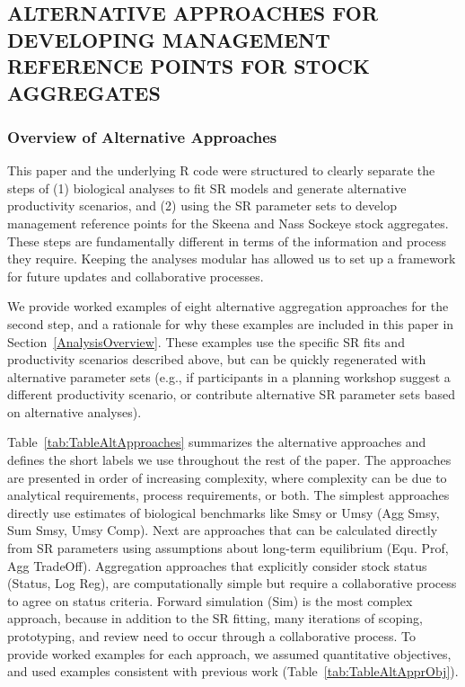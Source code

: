 \documentclass[french,11pt]{book}
\begin{document}
\endgroup{} \endgroup{}

\clearpage

\subsection{ALTERNATIVE APPROACHES FOR DEVELOPING MANAGEMENT REFERENCE POINTS FOR STOCK AGGREGATES}\label{AltApproachesComp}

\subsubsection{Overview of Alternative Approaches}\label{overview-of-alternative-approaches}

This paper and the underlying R code were structured to clearly separate the steps of (1) biological analyses to fit SR models and generate alternative productivity scenarios, and (2) using the SR parameter sets to develop management reference points for the Skeena and Nass Sockeye stock aggregates. These steps are fundamentally different in terms of the information and process they require. Keeping the analyses modular has allowed us to set up a framework for future updates and collaborative processes.

We provide worked examples of eight alternative aggregation approaches for the second step, and a rationale for why these examples are included in this paper in Section~\ref{AnalysisOverview}. These examples use the specific SR fits and productivity scenarios described above, but can be quickly regenerated with alternative parameter sets (e.g., if participants in a planning workshop suggest a different productivity scenario, or contribute alternative SR parameter sets based on alternative analyses).

Table~\ref{tab:TableAltApproaches} summarizes the alternative approaches and defines the short labels we use throughout the rest of the paper. The approaches are presented in order of increasing complexity, where complexity can be due to analytical requirements, process requirements, or both. The simplest approaches directly use estimates of biological benchmarks like Smsy or Umsy (Agg Smsy, Sum Smsy, Umsy Comp). Next are approaches that can be calculated directly from SR parameters using assumptions about long-term equilibrium (Equ. Prof, Agg TradeOff). Aggregation approaches that explicitly consider stock status (Status, Log Reg), are computationally simple but require a collaborative process to agree on status criteria. Forward simulation (Sim) is the most complex approach, because in addition to the SR fitting, many iterations of scoping, prototyping, and review need to occur through a collaborative process. To provide worked examples for each approach, we assumed quantitative objectives, and used examples consistent with previous work (Table~\ref{tab:TableAltApprObj}).
\end{document}
